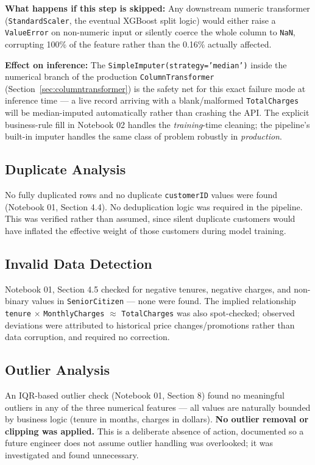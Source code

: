 \documentclass[11pt]{article}
\newcommand{\artifact}[1]{\texttt{\color{navy}#1}}
\begin{document}
\textbf{What happens if this step is skipped:} Any downstream numeric transformer (\texttt{StandardScaler}, the eventual XGBoost split logic) would either raise a \texttt{ValueError} on non-numeric input or silently coerce the whole column to \texttt{NaN}, corrupting 100\% of the feature rather than the 0.16\% actually affected.

\textbf{Effect on inference:} The \texttt{SimpleImputer(strategy='median')} inside the numerical branch of the production \texttt{ColumnTransformer} (Section~\ref{sec:columntransformer}) is the safety net for this exact failure mode at inference time --- a live record arriving with a blank/malformed \artifact{TotalCharges} will be median-imputed automatically rather than crashing the API. The explicit business-rule fill in Notebook 02 handles the \emph{training}-time cleaning; the pipeline's built-in imputer handles the same class of problem robustly in \emph{production}.

\subsection{Duplicate Analysis}

No fully duplicated rows and no duplicate \artifact{customerID} values were found (Notebook 01, Section 4.4). No deduplication logic was required in the pipeline. This was verified rather than assumed, since silent duplicate customers would have inflated the effective weight of those customers during model training.

\subsection{Invalid Data Detection}

Notebook 01, Section 4.5 checked for negative tenures, negative charges, and non-binary values in \artifact{SeniorCitizen} --- none were found. The implied relationship \artifact{tenure} $\times$ \artifact{MonthlyCharges} $\approx$ \artifact{TotalCharges} was also spot-checked; observed deviations were attributed to historical price changes/promotions rather than data corruption, and required no correction.

\subsection{Outlier Analysis}

An IQR-based outlier check (Notebook 01, Section 8) found no meaningful outliers in any of the three numerical features --- all values are naturally bounded by business logic (tenure in months, charges in dollars). \textbf{No outlier removal or clipping was applied.} This is a deliberate absence of action, documented so a future engineer does not assume outlier handling was overlooked; it was investigated and found unnecessary.
\end{document}
